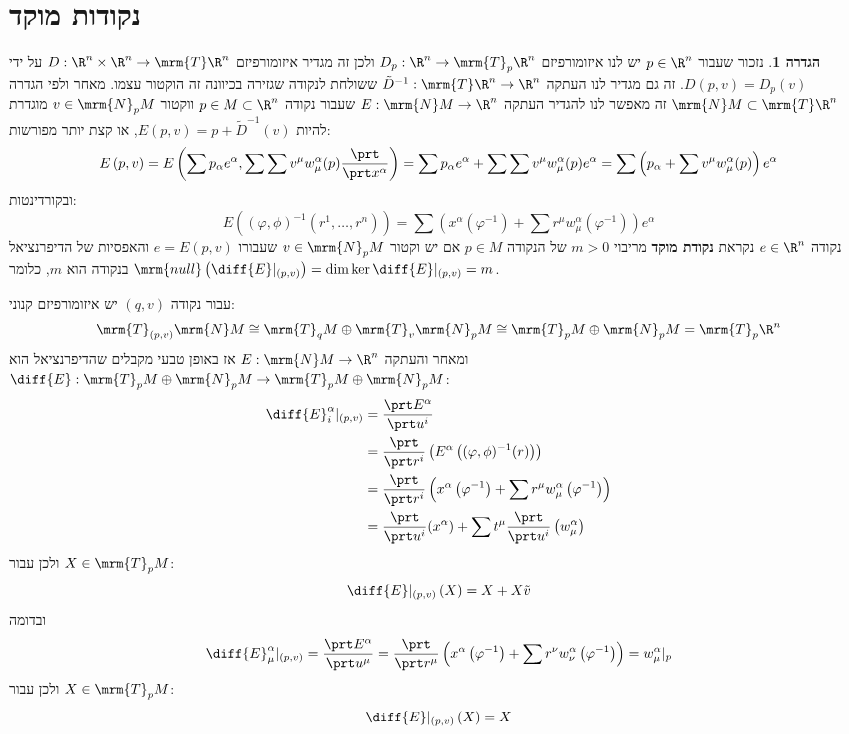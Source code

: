 \documentclass{article}
\theoremstyle{definition}
\newtheorem*{definition*}{הגדרה}
\begin{document}
	\section{נקודות מוקד}

	\begin{definition*}
		נזכור שעבור
		\(p\in\R^n\)
		יש לנו איזומורפיזם
		\(D_p: \R^n \to \mrm{T}_p \R^n\)
		ולכן זה מגדיר איזומורפיזם
		\(D: \R^n \times \R^n \to \mrm{T} \R^n\)
		על ידי
		\(D(p,v)=D_p(v)\).
		זה גם מגדיר לנו העתקה
		\(\tilde{D}^{-1}: \mrm{T} \R^n \to \R^n\)
		ששולחת לנקודה שגזירה בכיוונה זה הוקטור עצמו.
		מאחר ולפי הגדרה
		\(\mrm{N} M \subset \mrm{T} \R^n\)
		זה מאפשר לנו להגדיר העתקה
		\(E:\mrm{N} M \to \R^n\)
		שעבור נקודה
		\(p \in M \subset \R^n\)
		ווקטור
		\(v \in \mrm{N}_p M\)
		מוגדרת להיות
		\(E(p,v)=p+\tilde{D}^{-1}(v)\),
		או קצת יותר מפורשות:
		\[
			E\left(p,v\right)
			=E\left(\sum p_\alpha e^\alpha,\sum \sum v^\mu w_\mu^\alpha(p) \frac{\prt}{\prt x^\alpha}\right)
			=\sum p_\alpha e^\alpha + \sum\sum v^\mu w_\mu^\alpha(p) e^\alpha
			=\sum \left(p_\alpha + \sum v^\mu w_\mu^\alpha(p)\right) e^\alpha
		\]
		ובקורדינטות:
		\[
			E\left(\left(\varphi,\phi\right)^{-1}\left(r^1,\dotsc,r^n\right)\right)
			=\sum \left(
				x^\alpha\left(\varphi^{-1}\right)
				+\sum r^\mu w_\mu^\alpha\left(\varphi^{-1}\right)
			\right) e^\alpha
		\]
		נקודה
		\(e \in \R^n\)
		נקראת \textbf{נקודת מוקד} מריבוי
		\(m>0\)
		של הנקודה
		\(p \in M\)
		אם יש וקטור
		\(v \in \mrm{N}_p M\)
		שעבורו
		\(e = E(p,v)\)
		והאפסיות של הדיפרנציאל בנקודה הוא \(m\), כלומר
		\(\mrm{null}\left(\diff{E}|_{(p,v)}\right) = \dim \ker \diff{E}|_{(p,v)} = m\).
	\end{definition*}

	עבור נקודה
	\((q,v)\)
	יש איזומורפיזם קנוני:
	\[
		\mrm{T}_{(p,v)} \mrm{N} M
		\cong \mrm{T}_q M \oplus \mrm{T}_v \mrm{N}_p M
		\cong \mrm{T}_p M \oplus \mrm{N}_p M
		= \mrm{T}_p \R^n
	\]
	ומאחר והעתקה
	\(E: \mrm{N} M \to \R^n\)
	אז באופן טבעי מקבלים שהדיפרנציאל הוא
	\(\diff{E}: \mrm{T}_p M \oplus \mrm{N}_p M \to \mrm{T}_p M \oplus \mrm{N}_p M\):
	\begin{equation*}\begin{split}
		\diff{E}^\alpha_i|_{\left(p,v\right)}
		&= \frac{\prt E^\alpha}{\prt u^i}
		\\&= \frac{\prt}{\prt r^i}\left (E^\alpha\left((\varphi,\phi)^{-1}(r)\right)\right)
		\\&= \frac{\prt}{\prt r^i} \left(x^\alpha\left(\varphi^{-1}\right)
		+\sum r^\mu w_\mu^\alpha\left(\varphi^{-1}\right)\right)
		\\&= \frac{\prt}{\prt u^i}(x^\alpha) + \sum t^\mu \frac{\prt}{\prt u^i} \left(w_\mu^\alpha\right)
	\end{split}\end{equation*}
	ולכן עבור
	\(X\in \mrm{T}_p M\):
	\[
		\diff{E}|_{\left(p,v\right)} \left(X\right)
		=X+X\tilde{v}
	\]
	ובדומה
	\begin{equation*}
		\diff{E}^\alpha_\mu|_{\left(p,v\right)}
		= \frac{\prt E^\alpha}{\prt u^\mu}
		= \frac{\prt}{\prt r^\mu} \left(x^\alpha\left(\varphi^{-1}\right)
		+\sum r^\nu w_\nu^\alpha\left(\varphi^{-1}\right)\right)
		= w_\mu^\alpha|_p
	\end{equation*}
	ולכן עבור
	\(X\in \mrm{T}_p M\):
	\[
		\diff{E}|_{\left(p,v\right)} \left(X\right) = X
	\]
\end{document}

